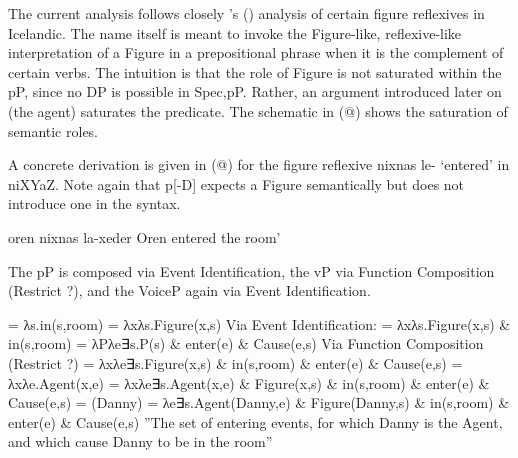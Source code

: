 The current analysis follows closely \citeauthor{wood15springer}’s (\citeyear{wood15springer}) analysis of certain figure reflexives in Icelandic. The name itself is meant to invoke the Figure-like, reflexive-like interpretation of a Figure in a prepositional phrase when it is the complement of certain verbs. The intuition is that the role of Figure is not saturated within the pP, since no DP is possible in Spec,pP. Rather, an argument introduced later on (the agent) saturates the predicate. The schematic in (@) shows the saturation of semantic roles.



A concrete derivation is given in (@) for the figure reflexive nixnas le- ‘entered’ in niXYaZ. Note again that p[-D] expects a Figure semantically but does not introduce one in the syntax.

    oren nixnas la-xeder Oren entered the room'



The pP is composed via Event Identification, the vP via Function Composition (Restrict \cite{chungladusaw04}?), and the VoiceP again via Event Identification.

 = λs.in(s,room)
         = λxλs.Figure(x,s)
        Via Event Identification:
         = λxλs.Figure(x,s) \& in(s,room) 
         = λPλe∃s.P(s) \& enter(e) \& Cause(e,s)
    Via Function Composition (Restrict \cite{chungladusaw04}?)
            = λxλe∃s.Figure(x,s) \& in(s,room) \& enter(e) \& Cause(e,s)
         = λxλe.Agent(x,e)
        = λxλe∃s.Agent(x,e) \& Figure(x,s) \& in(s,room) \& enter(e) \& Cause(e,s)
         = (Danny) = 
        λe∃s.Agent(Danny,e) \& Figure(Danny,s) \& in(s,room) \& enter(e) \& Cause(e,s) 
        ''The set of entering events, for which Danny is the Agent, and which cause Danny to be in the room''

